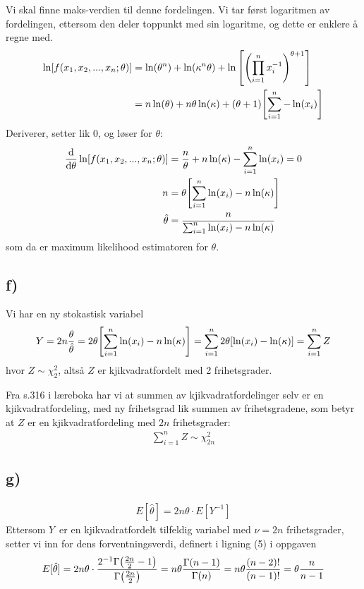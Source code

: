 \documentclass[12p,a4paper]{article}
\begin{document}
Vi skal finne maks-verdien til denne fordelingen. Vi tar først logaritmen av fordelingen, ettersom den deler toppunkt med sin logaritme, og dette er enklere å regne med.
\begin{align*}
    \ln[f(x_1, x_2, ..., x_n; \theta)]
    &= \ln(\theta^n) + \ln(\kappa^n\theta) + \ln\qty[\qty(\prod_{i=1}^n x_i^{-1})^{\theta+1}] \\
    &= n\ln(\theta) + n\theta\ln(\kappa) + (\theta + 1)\qty[ \sum_{i=1}^n -\ln(x_i) ]
\end{align*}
Deriverer, setter lik 0, og løser for $\theta$:
\begin{align*}
    \dv{\theta} \ln[f(x_1, x_2, ..., x_n; \theta)] &= \frac{n}{\theta} + n\ln(\kappa) - \sum_{i=1}^n \ln(x_i) = 0 \\
    n &= \theta\qty[\sum_{i=1}^n \ln(x_i) - n\ln(\kappa)] \\
    \hat{\theta} &= \frac{n}{\sum_{i=1}^n \ln(x_i) - n\ln(\kappa)}
\end{align*}
som da er maximum likelihood estimatoren for $\theta$.



\subsection*{f)}
Vi har en ny stokastisk variabel
\begin{align*}
    Y = 2n\frac{\theta}{\hat{\theta}} = 2\theta\qty[\sum_{i=1}^n \ln(x_i) - n\ln(\kappa)] = \sum_{i=1}^n 2\theta\qty[\ln(x_i) - \ln(\kappa)] = \sum_{i=1}^n Z
\end{align*}
hvor $Z \sim \chi_2^2$, altså $Z$ er kjikvadratfordelt med 2 frihetsgrader.

Fra s.316 i læreboka har vi at summen av kjikvadratfordelinger selv er en kjikvadratfordeling, med ny frihetsgrad lik summen av frihetsgradene, som betyr at $Z$ er en kjikvadratfordeling med $2n$ frihetsgrader:
\begin{align*}
    \sum_{i=1}^n Z \sim \chi_{2n}^2
\end{align*}



\subsection*{g)}
\begin{align*}
    E[\hat{\theta}] = 2n\theta \cdot E[Y^{-1}]
\end{align*}
Ettersom $Y$ er en kjikvadratfordelt tilfeldig variabel med $\nu = 2n$ frihetsgrader, setter vi inn for dens forventningsverdi, definert i ligning (5) i oppgaven
\begin{align*}
    E[\hat{\theta}] = 2n\theta \cdot \frac{2^{-1} \Gamma\qty(\frac{2n}{2} - 1)}{\Gamma\qty(\frac{2n}{2})} = n\theta\frac{\Gamma\qty(n - 1)}{\Gamma\qty(n)} = n\theta \frac{(n-2)!}{(n-1)!} = \theta\frac{n}{n-1}
\end{align*}
\end{document}
